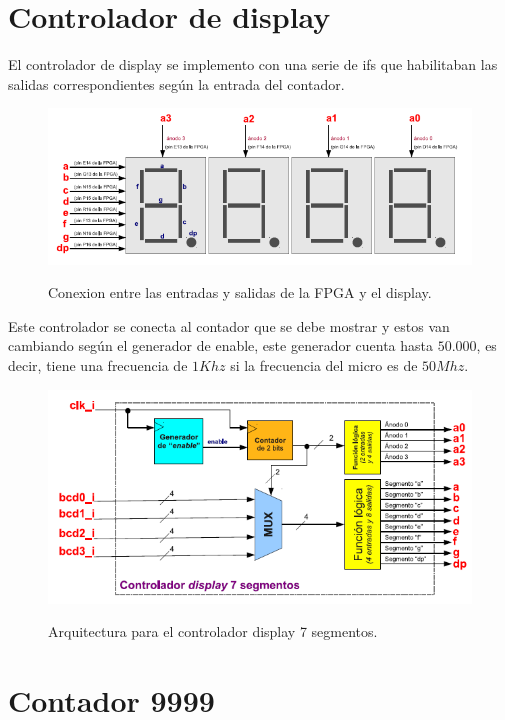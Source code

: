 \documentclass{article}
\begin{document}
\section{Controlador de display}

El controlador de display se implemento con una serie de ifs que habilitaban las salidas correspondientes según la entrada del contador. 

\begin{figure}[h!]
  \centering
	\includegraphics[scale=0.7]{display.png}\\[1cm] 
  \caption{Conexion entre las entradas y salidas de la FPGA y el display.}
\end{figure}

Este controlador se conecta al contador que se debe mostrar y estos van cambiando según el generador de enable, este generador cuenta hasta \( 50.000 \), es decir, tiene una frecuencia de \( 1 Khz \) si la frecuencia del micro es de \( 50 Mhz \).

\begin{figure}[h!]
  \centering
	\includegraphics[scale=0.7]{controlador.png}\\[1cm] 
  \caption{Arquitectura para el controlador display 7 segmentos.}
\end{figure}


\section{Contador 9999}
\end{document}
